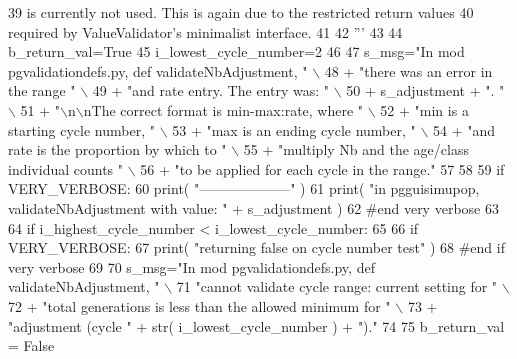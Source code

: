\begin{DoxyCode}
39 \textcolor{stringliteral}{    is currently not used.  This is again due to the restricted return values }
40 \textcolor{stringliteral}{    required by ValueValidator's minimalist interface.}
41 \textcolor{stringliteral}{}
42 \textcolor{stringliteral}{    '''}
43 
44     b\_return\_val=\textcolor{keyword}{True}
45     i\_lowest\_cycle\_number=2
46 
47     s\_msg=\textcolor{stringliteral}{"In mod pgvalidationdefs.py, def validateNbAdjustment, "} \(\backslash\)
48                         + \textcolor{stringliteral}{"there was an error in the range "} \(\backslash\)
49                         + \textcolor{stringliteral}{"and rate entry. The entry was: "} \(\backslash\)
50                         + s\_adjustment + \textcolor{stringliteral}{".  "} \(\backslash\)
51                         + \textcolor{stringliteral}{"\(\backslash\)n\(\backslash\)nThe correct format is min-max:rate, where "} \(\backslash\)
52                         + \textcolor{stringliteral}{"min is a starting cycle number, "} \(\backslash\)
53                         + \textcolor{stringliteral}{"max is an ending cycle number, "} \(\backslash\)
54                         + \textcolor{stringliteral}{"and rate is the proportion by which to "} \(\backslash\)
55                         + \textcolor{stringliteral}{"multiply Nb and the age/class individual counts "} \(\backslash\)
56                         + \textcolor{stringliteral}{"to be applied for each cycle in the range."} 
57 
58 
59     \textcolor{keywordflow}{if} VERY\_VERBOSE:
60         print( \textcolor{stringliteral}{"--------------------"} )
61         print( \textcolor{stringliteral}{"in pgguisimupop, validateNbAdjustment with value: "}  + s\_adjustment )
62     \textcolor{comment}{#end very verbose }
63 
64     \textcolor{keywordflow}{if}  i\_highest\_cycle\_number < i\_lowest\_cycle\_number:
65 
66         \textcolor{keywordflow}{if} VERY\_VERBOSE:
67             print( \textcolor{stringliteral}{"returning false on cycle number test"} )
68         \textcolor{comment}{#end if very verbose}
69 
70         s\_msg=\textcolor{stringliteral}{"In mod pgvalidationdefs.py, def validateNbAdjustment, "} \(\backslash\)
71                 \textcolor{stringliteral}{"cannot validate cycle range:  current setting for "} \(\backslash\)
72                 + \textcolor{stringliteral}{"total generations is less than the allowed minimum for "} \(\backslash\)
73                 + \textcolor{stringliteral}{"adjustment (cycle "} + str( i\_lowest\_cycle\_number ) + \textcolor{stringliteral}{")."}
74 
75         b\_return\_val = \textcolor{keyword}{False}

\end{DoxyCode}
